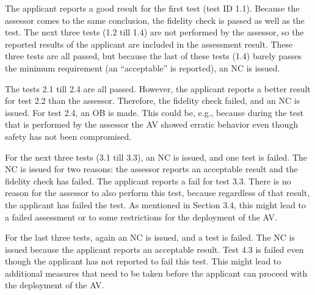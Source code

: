 The applicant reports a good result for the first test (test ID 1.1). Because the assessor comes to the same conclusion, the fidelity check is passed as well as the test. The next three tests (1.2 till 1.4) are not performed by the assessor, so the reported results of the applicant are included in the assessment result. These three tests are all passed, but because the last of these tests (1.4) barely passes the minimum requirement (an “acceptable” is reported), an NC is issued.

The tests 2.1 till 2.4 are all passed. However, the applicant reports a better result for test 2.2 than the assessor. Therefore, the fidelity check failed, and an NC is issued. For test 2.4, an OB is made. This could be, e.g., because during the test that is performed by the assessor the AV showed erratic behavior even though safety has not been compromised.

For the next three tests (3.1 till 3.3), an NC is issued, and one test is failed. The NC is issued for two reasons: the assessor reports an acceptable result and the fidelity check has failed. The applicant reports a fail for test 3.3. There is no reason for the assessor to also perform this test, because regardless of that result, the applicant has failed the test. As mentioned in Section 3.4, this might lead to a failed assessment or to some restrictions for the deployment of the AV. 

For the last three tests, again an NC is issued, and a test is failed. The NC is issued because the applicant reports an acceptable result. Test 4.3 is failed even though the applicant has not reported to fail this test. This might lead to additional measures that need to be taken before the applicant can proceed with the deployment of the AV.
